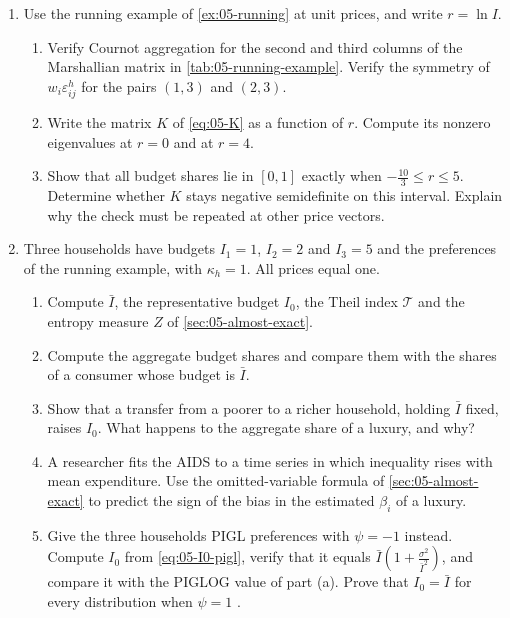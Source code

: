 \begin{enumerate}[label=\arabic*., leftmargin=*, itemsep=6pt]
\item Use the running example of \cref{ex:05-running} at unit prices, and write $r = \ln I$.
\begin{enumerate}[label=(\alph*)]
  \item Verify Cournot aggregation for the second and third columns of the Marshallian matrix in
  \cref{tab:05-running-example}. Verify the symmetry of $w_i\varepsilon^h_{ij}$ for the pairs $(1,3)$ and $(2,3)$.
  \item Write the matrix $K$ of \eqref{eq:05-K} as a function of $r$. Compute its nonzero eigenvalues at $r = 0$
  and at $r = 4$.
  \item Show that all budget shares lie in $[0,1]$ exactly when $-\frac{10}{3} \le r \le 5$. Determine whether
  $K$ stays negative semidefinite on this interval. Explain why the check must be repeated at other price
  vectors.
\end{enumerate}

\item Three households have budgets $I_1 = 1$, $I_2 = 2$ and $I_3 = 5$ and the preferences of the running example,
with $\kappa_h = 1$. All prices equal one.
\begin{enumerate}[label=(\alph*)]
  \item Compute $\bar I$, the representative budget $I_0$, the Theil index $\mathcal{T}$ and the entropy measure
  $Z$ of \cref{sec:05-almost-exact}.
  \item Compute the aggregate budget shares and compare them with the shares of a consumer whose budget is $\bar I$.
  \item Show that a transfer from a poorer to a richer household, holding $\bar I$ fixed, raises $I_0$. What happens
  to the aggregate share of a luxury, and why?
  \item A researcher fits the AIDS to a time series in which inequality rises with mean expenditure. Use the
  omitted-variable formula of \cref{sec:05-almost-exact} to predict the sign of the bias in the estimated
  $\beta_i$ of a luxury.
  \item Give the three households PIGL preferences with $\psi = -1$ instead. Compute $I_0$ from
  \eqref{eq:05-I0-pigl}, verify that it equals $\bar I(1 + \frac{\sigma^2}{\bar I^2})$, and compare it with the
  PIGLOG value of part (a). Prove that $I_0 = \bar I$ for every distribution when $\psi = 1$
  \citep[Exercise~6.10]{DeatonMuellbauer1980b}.
\end{enumerate}


\end{enumerate}
